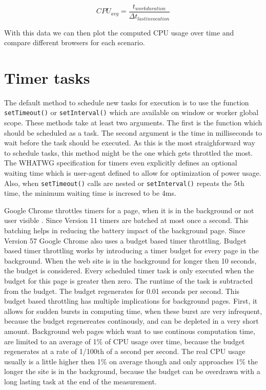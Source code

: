 \documentclass[
	ngerman,
	ruledheaders=section,%
	class=report,%
	thesis={type=bachelor},%
	accentcolor=9c,%
	custommargins=true,%
	marginpar=false,%
	parskip=half-,%
	fontsize=11pt,%
]{tudapub}
\begin{document}
  \begin{equation*}
    CPU_{avg} = \frac{t_{work duration}}{\Delta t_{last invocation}}
  \end{equation*}

  With this data we can then plot the computed CPU usage over time and compare different browsers for each scenario.

  
  \section{Timer tasks}

  The default method to schedule new tasks for execution is to use the function \texttt{setTimeout()} or \texttt{setInterval()} which are available on window or worker global scope. These methods take at least two arguments. The first is the function which should be scheduled as a task. The second argument is the time in milliseconds to wait before the task should be executed. As this is the most straighforward way to schedule tasks, this method might be the one which gets throttled the most. The WHATWG specification for timers \cite{whatwg-timers} even explicitly defines an optional waiting time which is user-agent defined to allow for optimization of power usage. Also, when \texttt{setTimeout()} calls are nested or \texttt{setInterval()} repeats the 5th time, the minimum waiting time is incresed to be 4ms.

  Google Chrome throttles timers for a page, when it is in the background or not user visible \cite{chrome-background-tabs}. Since Version 11 timers are batched at most once a second. This batching helps in reducing the battery impact of the background page. Since Version 57 Google Chrome also uses a budget based timer throttling. Budget based timer throttling works by introducing a timer budget for every page in the background. When the web site is in the background for longer then 10 seconds, the budget is considered. Every scheduled timer task is only executed when the budget for this page is greater then zero. The runtime of the task is subtracted from the budget. The budget regenerates for 0.01 seconds per second. This budget based throttling has multiple implications for background pages. First, it allows for sudden bursts in computing time, when these burst are very infrequent, because the budget regenereates continously, and can be depleted in a very short amount. Background web pages which want to use continous computation time, are limited to an average of 1\% of CPU usage over time, because the budget regenerates at a rate of 1/100th of a second per second. The real CPU usage usually is a little higher then 1\% on average though and only approaches 1\% the longer the site is in the background, because the budget can be overdrawn with a long lasting task at the end of the measurement.
\end{document}
